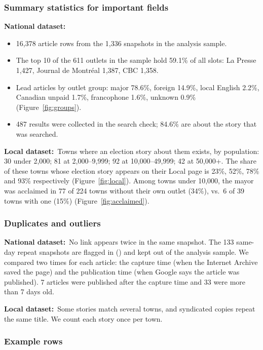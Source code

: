\documentclass[11pt,letterpaper]{article}
\newcommand{\code}[1]{\texttt{\detokenize{#1}}}
\newcommand{\nat}{\textbf{National dataset:}~}
\newcommand{\loc}{\textbf{Local dataset:}~}
\begin{document}
\subsubsection{Summary statistics for important fields}
\nat
\begin{itemize}
\item 16,378 article rows from the 1,336 snapshots in the analysis sample.
\item The top 10 of the 611 outlets in the sample hold 59.1\% of all slots: La Presse 1,427, Journal de Montréal 1,387, CBC 1,358.
\item Lead articles by outlet group: major 78.6\%, foreign 14.9\%, local English 2.2\%, Canadian unpaid 1.7\%, francophone 1.6\%, unknown 0.9\% (Figure~\ref{fig:groups}).
\item 487 results were collected in the search check; 84.6\% are about the story that was searched.
\end{itemize}

\loc Towns where an election story about them exists, by population: 30 under 2,000; 81 at 2,000--9,999; 92 at 10,000--49,999; 42 at 50,000+. The share of these towns whose election story appears on their Local page is 23\%, 52\%, 78\% and 93\% respectively (Figure~\ref{fig:local}). Among towns under 10,000, the mayor was acclaimed in 77 of 224 towns without their own outlet (34\%), vs.\ 6 of 39 towns with one (15\%) (Figure~\ref{fig:acclaimed}).

\subsubsection{Duplicates and outliers}
\nat No link appears twice in the same snapshot. The 133 same-day repeat snapshots are flagged in \code{snapshots.csv} (\code{purpose = repeat}) and kept out of the analysis sample. We compared two times for each article: the capture time (when the Internet Archive saved the page) and the publication time (when Google says the article was published). 7 articles were published after the capture time and 33 were more than 7 days old.

\loc Some stories match several towns, and syndicated copies repeat the same title. We count each story once per town.

\subsubsection{Example rows}
\end{document}
